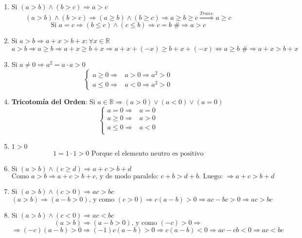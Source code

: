 \documentclass[10pt,a4paper,openright]{book}
\theoremstyle{break}
\begin{document}
\begin{enumerate}
\item Si $(a>b)\wedge (b>c)\Rightarrow a>c$
$$(a>b)\wedge (b>c)\Rightarrow (a\geq b)\wedge (b\geq c)\Rightarrow a\geq b \geq c\stackrel{Trans.}{\Rightarrow} a\geq c$$
$$\mbox{Si } a=c\Rightarrow (b\leq c) \wedge (c\leq b)\Rightarrow c=b\mbox{ \#}\Rightarrow a>c$$
\vspace{0.5cm}

\item Si $a>b\Rightarrow a+x>b+x: \forall x\in \mathbb R$
$$a>b\Rightarrow a\geq b \Rightarrow a+x\geq b+x \Rightarrow a+x+(-x)\geq b+x+(-x)\Leftrightarrow a\geq b \mbox{ \#}\Rightarrow a+x>b+x$$
\vspace{0.5cm}

\item Si $a\neq 0\Rightarrow a^2=a\cdot a>0$
$$\begin{cases}
a\geq 0 \Rightarrow & a>0\Rightarrow a^2>0 \\
a\leq 0 \Rightarrow & a<0 \Rightarrow a^2>0
\end{cases}$$
\vspace{0.5cm}

\item \textbf{Tricotomía del Orden}: Si $a\in \mathbb R\Rightarrow (a>0)\vee (a<0)\vee (a=0)$
$$\begin{cases}
a=0\Rightarrow & a=0 \\
a\geq 0 \Rightarrow & a>0 \\
a\leq 0 \Rightarrow & a<0 \\
\end{cases}$$
\vspace{0.5cm}

\item $1>0$
$$1=1\cdot 1>0 \mbox{ Porque el elemento neutro es positivo}$$
\vspace{0.5cm}

\item Si $(a>b) \wedge (c\geq d)\Rightarrow a+c>b+d$
$$\mbox{Como } a>b\Rightarrow a+c>b+c\mbox{, y de modo paralelo: } c+b>d+b\mbox{. Luego: }\Rightarrow a+c>b+d$$
\vspace{0.5cm}

\item Si $(a>b) \wedge (c>0)\Rightarrow ac>bc$
$$(a>b)\Rightarrow (a-b>0)\mbox{, y como } (c>0)\Rightarrow c(a-b)>0 \Rightarrow ac-bc>0\Rightarrow ac>bc$$
\vspace{0.5cm}

\item Si $(a>b)\wedge (c<0)\Rightarrow ac<bc$
$$(a>b)\Rightarrow (a-b>0)\mbox{, y como }(-c)>0 \Rightarrow $$
$$\Rightarrow (-c)(a-b)>0 \Rightarrow (-1)c(a-b)>0\Rightarrow c(a-b)<0\Rightarrow ac-cb<0\Rightarrow ac<bc$$
\vspace{0.5cm}


\end{enumerate}
\end{document}
